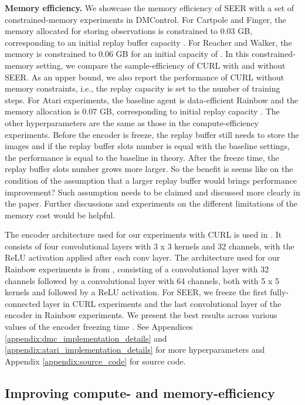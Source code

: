 \documentclass{article}
\begin{document}
\textbf{Memory efficiency.} We showcase the memory efficiency of SEER with a set of constrained-memory experiments in DMControl. For Cartpole and Finger, the memory allocated for storing observations is constrained to 0.03 GB, corresponding to an initial replay buffer capacity . For Reacher and Walker, the memory is constrained to 0.06 GB for an initial capacity of . In this constrained-memory setting, we compare the sample-efficiency of CURL with and without SEER.
As an upper bound, we also report the performance of CURL without memory constraints, i.e., the replay capacity is set to the number of training steps.
For Atari experiments,
the baseline agent is data-efficient Rainbow and the memory allocation is 0.07 GB, corresponding to initial replay capacity . 
The other hyperparameters are the same as those in the compute-efficiency experiments. 
Before the encoder is freeze, the replay buffer still needs to store the images and if the replay buffer slots number is equal with the baseline settings, the performance is equal to the baseline in theory. After the freeze time, the replay buffer slots number grows more larger. So the benefit is seems like on the condition of the assumption that a larger replay buffer would brings performance improvement? Such assumption needs to be claimed and discussed more clearly in the paper. Further discussions and experiments on the different limitations of the memory cost would be helpful.

The encoder architecture used for our experiments with CURL is used in \citet{yarats2019improving}. It consists of four convolutional layers
with 3 x 3 kernels and 32 channels, with the ReLU activation applied after each conv layer. The architecture used for our Rainbow experiments is from \citet{van2019use}, consisting of a convolutional layer with 32 channels followed by a convolutional layer with 64 channels, both with 5 x 5 kernels and followed by a ReLU activation. For SEER, we freeze the first fully-connected layer in CURL experiments and the last convolutional layer of the encoder in Rainbow experiments. We present the best results across various values of the encoder freezing time . See Appendices \ref{appendix:dmc_implementation_details} and  \ref{appendix:atari_implementation_details} for more hyperparameters and Appendix \ref{appendix:source_code} for source code.

\subsection{Improving compute- and memory-efficiency} \label{main_exps}
\end{document}
